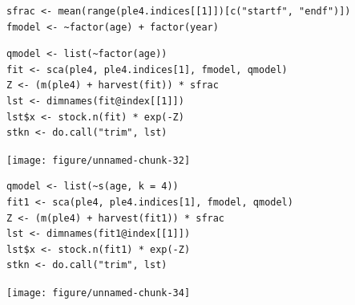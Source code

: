 \documentclass[a4paper,english,10pt]{article}\usepackage[]{graphicx}\usepackage[]{color}
\makeatletter
\newenvironment{kframe}{%
 \def\at@end@of@kframe{}%
 \ifinner\ifhmode%
  \def\at@end@of@kframe{\end{minipage}}%
  \begin{minipage}{\columnwidth}%
 \fi\fi%
 \def\FrameCommand##1{\hskip\@totalleftmargin \hskip-\fboxsep
 \colorbox{shadecolor}{##1}\hskip-\fboxsep
     \hskip-\linewidth \hskip-\@totalleftmargin \hskip\columnwidth}%
 \MakeFramed {\advance\hsize-\width
   \@totalleftmargin\z@ \linewidth\hsize
   \@setminipage}}%
 {\par\unskip\endMakeFramed%
 \at@end@of@kframe}
\newenvironment{knitrout}{}{} %
\makeatother
\begin{document}
\begin{knitrout}
\color{fgcolor}\begin{kframe}
\begin{verbatim}
sfrac <- mean(range(ple4.indices[[1]])[c("startf", "endf")])
fmodel <- ~factor(age) + factor(year)
\end{verbatim}
\end{kframe}
\end{knitrout}


\begin{knitrout}
\color{fgcolor}\begin{kframe}
\begin{verbatim}
qmodel <- list(~factor(age))
fit <- sca(ple4, ple4.indices[1], fmodel, qmodel)
Z <- (m(ple4) + harvest(fit)) * sfrac
lst <- dimnames(fit@index[[1]])
lst$x <- stock.n(fit) * exp(-Z)
stkn <- do.call("trim", lst)
\end{verbatim}
\end{kframe}
\end{knitrout}


\begin{knitrout}
\color{fgcolor}

{\centering \texttt{[image: figure/unnamed-chunk-32]} 

}



\end{knitrout}


\begin{knitrout}
\color{fgcolor}\begin{kframe}
\begin{verbatim}
qmodel <- list(~s(age, k = 4))
fit1 <- sca(ple4, ple4.indices[1], fmodel, qmodel)
Z <- (m(ple4) + harvest(fit1)) * sfrac
lst <- dimnames(fit1@index[[1]])
lst$x <- stock.n(fit1) * exp(-Z)
stkn <- do.call("trim", lst)
\end{verbatim}
\end{kframe}
\end{knitrout}


\begin{knitrout}
\color{fgcolor}

{\centering \texttt{[image: figure/unnamed-chunk-34]} 

}



\end{knitrout}
\end{document}

